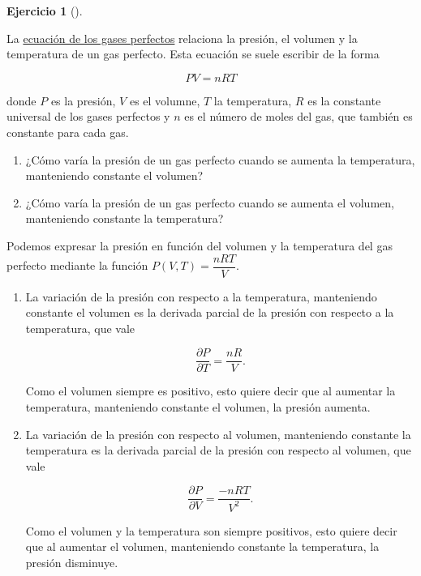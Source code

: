 \documentclass[
  a4paper,
]{scrreport}
\theoremstyle{definition}
\newtheorem{exercise}{Ejercicio}[chapter]
\theoremstyle{remark}
\begin{document}
\begin{exercise}[]\protect\hypertarget{exr-derivada-parcial-gases-perfectos}{}\label{exr-derivada-parcial-gases-perfectos}

La
\href{https://es.wikipedia.org/wiki/Ley_de_los_gases_ideales}{ecuación
de los gases perfectos} relaciona la presión, el volumen y la
temperatura de un gas perfecto. Esta ecuación se suele escribir de la
forma

\[
PV = nRT
\]

donde \(P\) es la presión, \(V\) es el volumne, \(T\) la temperatura,
\(R\) es la constante universal de los gases perfectos y \(n\) es el
número de moles del gas, que también es constante para cada gas.

\begin{enumerate}
\def\labelenumi{\alph{enumi}.}
\item
  ¿Cómo varía la presión de un gas perfecto cuando se aumenta la
  temperatura, manteniendo constante el volumen?
\item
  ¿Cómo varía la presión de un gas perfecto cuando se aumenta el
  volumen, manteniendo constante la temperatura?
\end{enumerate}

\end{exercise}

\begin{tcolorbox}[enhanced jigsaw, coltitle=black, toptitle=1mm, colframe=quarto-callout-tip-color-frame, colbacktitle=quarto-callout-tip-color!10!white, breakable, opacityback=0, bottomtitle=1mm, opacitybacktitle=0.6, title=\textcolor{quarto-callout-tip-color}{\faLightbulb}\hspace{0.5em}{Solución}, arc=.35mm, leftrule=.75mm, toprule=.15mm, titlerule=0mm, bottomrule=.15mm, left=2mm, rightrule=.15mm, colback=white]

Podemos expresar la presión en función del volumen y la temperatura del
gas perfecto mediante la función \(P(V,T) = \dfrac{nRT}{V}\).

\begin{enumerate}
\def\labelenumi{\alph{enumi}.}
\item
  La variación de la presión con respecto a la temperatura, manteniendo
  constante el volumen es la derivada parcial de la presión con respecto
  a la temperatura, que vale

  \[
  \frac{\partial P}{\partial T} = \frac{nR}{V}.
  \]

  Como el volumen siempre es positivo, esto quiere decir que al aumentar
  la temperatura, manteniendo constante el volumen, la presión aumenta.
\item
  La variación de la presión con respecto al volumen, manteniendo
  constante la temperatura es la derivada parcial de la presión con
  respecto al volumen, que vale

  \[
  \frac{\partial P}{\partial V} = \frac{-nRT}{V^2}.
  \]

  Como el volumen y la temperatura son siempre positivos, esto quiere
  decir que al aumentar el volumen, manteniendo constante la
  temperatura, la presión disminuye.
\end{enumerate}

\end{tcolorbox}
\end{document}
